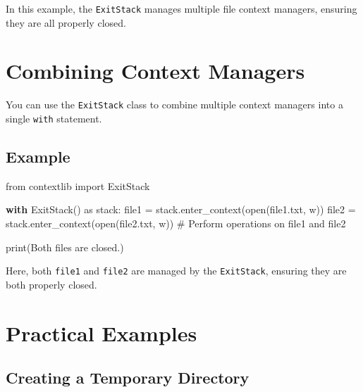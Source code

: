 \documentclass[
  letterpaper,
  DIV=11,
  numbers=noendperiod]{scrreprt}
\newenvironment{Shaded}{\begin{snugshade}}{\end{snugshade}}
\newcommand{\BuiltInTok}[1]{\textcolor[rgb]{0.00,0.23,0.31}{#1}}
\newcommand{\CommentTok}[1]{\textcolor[rgb]{0.37,0.37,0.37}{#1}}
\newcommand{\ControlFlowTok}[1]{\textcolor[rgb]{0.00,0.23,0.31}{\textbf{#1}}}
\newcommand{\ImportTok}[1]{\textcolor[rgb]{0.00,0.46,0.62}{#1}}
\newcommand{\NormalTok}[1]{\textcolor[rgb]{0.00,0.23,0.31}{#1}}
\newcommand{\OperatorTok}[1]{\textcolor[rgb]{0.37,0.37,0.37}{#1}}
\newcommand{\StringTok}[1]{\textcolor[rgb]{0.13,0.47,0.30}{#1}}
\begin{document}
In this example, the \texttt{ExitStack} manages multiple file context
managers, ensuring they are all properly closed.

\section{Combining Context Managers}\label{combining-context-managers}

You can use the \texttt{ExitStack} class to combine multiple context
managers into a single \texttt{with} statement.

\subsection{Example}\label{example-35}

\begin{Shaded}
\begin{Highlighting}[]
\ImportTok{from}\NormalTok{ contextlib }\ImportTok{import}\NormalTok{ ExitStack}

\ControlFlowTok{with}\NormalTok{ ExitStack() }\ImportTok{as}\NormalTok{ stack:}
\NormalTok{    file1 }\OperatorTok{=}\NormalTok{ stack.enter\_context(}\BuiltInTok{open}\NormalTok{(}\StringTok{\textquotesingle{}file1.txt\textquotesingle{}}\NormalTok{, }\StringTok{\textquotesingle{}w\textquotesingle{}}\NormalTok{))}
\NormalTok{    file2 }\OperatorTok{=}\NormalTok{ stack.enter\_context(}\BuiltInTok{open}\NormalTok{(}\StringTok{\textquotesingle{}file2.txt\textquotesingle{}}\NormalTok{, }\StringTok{\textquotesingle{}w\textquotesingle{}}\NormalTok{))}
    \CommentTok{\# Perform operations on file1 and file2}

\BuiltInTok{print}\NormalTok{(}\StringTok{\textquotesingle{}Both files are closed.\textquotesingle{}}\NormalTok{)}
\end{Highlighting}
\end{Shaded}

Here, both \texttt{file1} and \texttt{file2} are managed by the
\texttt{ExitStack}, ensuring they are both properly closed.

\section{Practical Examples}\label{practical-examples-6}

\subsection{Creating a Temporary
Directory}\label{creating-a-temporary-directory}
\end{document}
